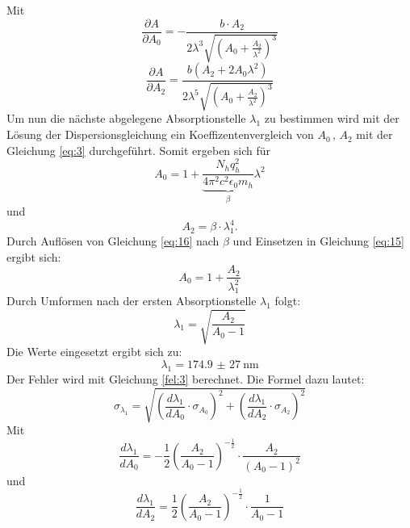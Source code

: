 Mit
\begin{equation*}
  \frac{\partial A} {\partial A_0} = -\frac{b\cdot A_2}{2\lambda^3 \sqrt{(A_0 + \frac{A_2}{\lambda^2})^3}}
\end{equation*}
\begin{equation*}
  \frac{\partial A}{\partial A_2} = \frac{b (A_2+2A_0\lambda^2)}{2\lambda^5 \sqrt{(A_0 + \frac{A_2}{\lambda^2})^3}}
\end{equation*}
Um nun die nächste abgelegene Absorptionstelle $\lambda_1$ zu bestimmen wird
mit der Lösung der Dispersionsgleichung ein Koeffizentenvergleich von $A_0 \, ,\, A_2$ mit
der Gleichung \ref{eq:3} durchgeführt.
Somit ergeben sich für
\begin{equation*}
  A_0 = 1 +\underbrace{\frac{N_h q_h^2}{4 \pi^2 c^2 \epsilon_0 m_h}}_\beta \lambda^2
  \label{eq:15}
\end{equation*}
und
\begin{equation*}
  A_2 = \beta \cdot \lambda_1^4.
  \label{eq:16}
\end{equation*}
Durch Auflösen von Gleichung \ref{eq:16} nach $\beta$ und Einsetzen in Gleichung \ref{eq:15} ergibt sich:
\begin{equation*}
  A_0 = 1+ \frac{A_2}{\lambda_1^2}
\end{equation*}
Durch Umformen nach der ersten Absorptionstelle $\lambda_1$ folgt:
\begin{equation*}
  \lambda_1 = \sqrt{\frac{A_2}{A_0-1}}
\end{equation*}
Die Werte eingesetzt ergibt sich zu:
\begin{equation*}
  \lambda_1 = \SI{174,9(27)}{\nano\meter}
\end{equation*}
Der Fehler wird mit Gleichung \ref{fel:3} berechnet.
Die Formel dazu lautet:
\begin{equation*}
  \sigma_{\lambda_1} = \sqrt{(\frac{d\lambda_1}{dA_0} \cdot \sigma_{A_0})^2 + (\frac{d\lambda_1}{dA_2} \cdot \sigma_{A_2})^2}
\end{equation*}
Mit
\begin{equation*}
  \frac{d\lambda_1}{dA_0} = -\frac{1}{2} (\frac{A_2}{A_0 -1})^{-\frac{1}{2}} \cdot \frac{A_2}{(A_0 - 1)^2}
\end{equation*}
und
\begin{equation*}
  \frac{d\lambda_1}{dA_2} = \frac{1}{2} (\frac{A_2}{A_0 -1})^{-\frac{1}{2}} \cdot \frac{1}{A_0 - 1}
\end{equation*}
